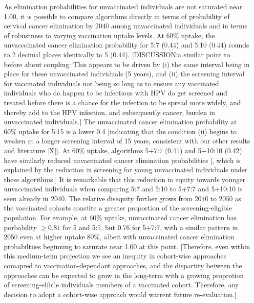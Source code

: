 As elimination probabilities for unvaccinated individuals are not saturated near 1.00, it is possible to compare algorithms directly in terms of probability of cervical cancer elimination by 2040 among unvaccinated individuals and in terms of robustness to varying vaccination uptake levels. At 60\% uptake, the unvacccinated cancer elimination probability for 5:7 (0.44) and 5:10 (0.44) rounds to 2 decimal places identically to 5 (0.44). [DISCUSSION:a similar point to before about coupling: This appears to be driven by (i) the same interval being in place for these unvaccinated individuals (5 years), and (ii) the screening interval for vaccinated individuals not being so long as to ensure any vaccinated individuals who do happen to be infectious with HPV do get screened and treated before there is a chance for the infection to be spread more widely, and thereby add to the HPV infection, and subsequently cancer, burden in unvaccinated individuals.] The unvaccinated cancer elimination probability at 60\% uptake for 5:15 is a lower 0.4 [indicating that the condition (ii) begins to weaken at a longer screening interval of 15 years, consistent with our other results and literature [X]]. At 60\% uptake, algorithms 5+7:7 (0.41) and 5+10:10 (0.42) have similarly reduced unvaccinated cancer elimination probabilities [, which is explained by the reduction in screening for young unvaccinated individuals under these algorithms.] It is remarkable that this reduction in equity towards younger unvaccinated individuals when comparing 5:7 and 5:10 to 5+7:7 and 5+10:10 is seen already in 2040. The relative disequity further grows from 2040 to 2050 as the vaccinated cohorts constite a greater proportion of the screening-eligible population. For example, at 60\% uptake, unvaccinated cancer elimination has porbability  \(\geq 0.81\) for 5 and 5:7, but 0.76 for 5+7:7, with a similar pattern in 2050 even at higher uptake 80\%, albeit with unvaccinated cancer elimination probabiltiies beginning to saturate near 1.00 at this point. [Therefore, even within this medium-term projection we see an inequity in cohort-wise approaches comapred to vaccination-dependant approaches, and the dispartity between the approaches can be expected to grow in the long-term with a growing proprotion of screening-elibile individuals members of a vaccinated cohort. Therefore, any decision to adopt a cohort-wise approach would warrent future re-evaluation.]

